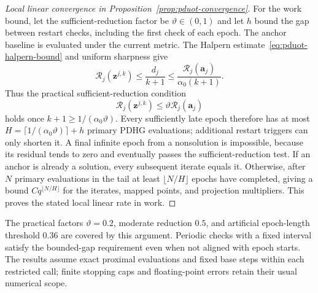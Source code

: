 \begin{proof}[Local linear convergence in Proposition~\ref{prop:pduot-convergence}]
For the work bound, let the sufficient-reduction factor be $\vartheta\in(0,1)$ and let $h$ bound the gap between restart checks, including the first check of each epoch.
The anchor baseline is evaluated under the current metric.
The Halpern estimate~\eqref{eq:pduot-halpern-bound} and uniform sharpness give
\begin{equation*}
\mathcal R_j(\mathbf z^{j,k})\leq\frac{d_j}{k+1}\leq\frac{\mathcal R_j(\mathbf a_j)}{\alpha_0(k+1)}.
\end{equation*}
Thus the practical sufficient-reduction condition
\begin{equation*}
\mathcal R_j(\mathbf z^{j,k})\leq\vartheta\mathcal R_j(\mathbf a_j)
\end{equation*}
holds once $k+1\geq1/(\alpha_0\vartheta)$.
Every sufficiently late epoch therefore has at most $H=\lceil1/(\alpha_0\vartheta)\rceil+h$ primary PDHG evaluations; additional restart triggers can only shorten it.
A final infinite epoch from a nonsolution is impossible, because its residual tends to zero and eventually passes the sufficient-reduction test.
If an anchor is already a solution, every subsequent iterate equals it.
Otherwise, after $N$ primary evaluations in the tail at least $\lfloor N/H\rfloor$ epochs have completed, giving a bound $Cq^{\lfloor N/H\rfloor}$ for the iterates, mapped points, and projection multipliers.
This proves the stated local linear rate in work.
\end{proof}

The practical factors $\vartheta=0.2$, moderate reduction $0.5$, and artificial epoch-length threshold $0.36$ are covered by this argument.
Periodic checks with a fixed interval satisfy the bounded-gap requirement even when not aligned with epoch starts.
The results assume exact proximal evaluations and fixed base steps within each restricted call; finite stopping caps and floating-point errors retain their usual numerical scope.
